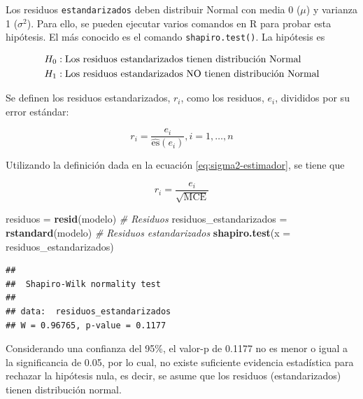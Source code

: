 \documentclass[
  11pt,
]{book}
\newenvironment{Shaded}{\begin{snugshade}}{\end{snugshade}}
\newcommand{\AttributeTok}[1]{\textcolor[rgb]{0.13,0.29,0.53}{#1}}
\newcommand{\CommentTok}[1]{\textcolor[rgb]{0.56,0.35,0.01}{\textit{#1}}}
\newcommand{\FunctionTok}[1]{\textcolor[rgb]{0.13,0.29,0.53}{\textbf{#1}}}
\newcommand{\NormalTok}[1]{#1}
\newcommand{\OtherTok}[1]{\textcolor[rgb]{0.56,0.35,0.01}{#1}}
\theoremstyle{definition}
\theoremstyle{definition}
\theoremstyle{definition}
\theoremstyle{definition}
\theoremstyle{remark}
\begin{document}
Los residuos \texttt{estandarizados} deben distribuir Normal con media 0 (\(\mu\)) y varianza 1 (\(\sigma^2\)). Para ello, se pueden ejecutar varios comandos en R para probar esta hipótesis. El más conocido es el comando \texttt{shapiro.test()}. La hipótesis es

\begin{equation}
\notag
\begin{split}
H_0&: \text{Los residuos estandarizados tienen distribución Normal}\\
H_1&: \text{Los residuos estandarizados NO tienen distribución Normal}\\
\end{split}
\end{equation}

Se definen los residuos estandarizados, \(r_i\), como los residuos, \(e_i\), divididos por su error estándar:

\begin{equation}
r_i = \frac{e_i}{\widehat{\text{es}}(e_i)}, i = 1,\ldots,n
\label{eq:residuos-estandarizados}
\end{equation}

Utilizando la definición dada en la ecuación \eqref{eq:sigma2-estimador}, se tiene que

\begin{equation}
r_i = \frac{e_i}{\sqrt{\text{MCE}}}
\label{eq:residuos-estandarizados-2}
\end{equation}

\begin{Shaded}
\begin{Highlighting}[]
\NormalTok{residuos }\OtherTok{=} \FunctionTok{resid}\NormalTok{(modelo) }\CommentTok{\# Residuos }
\NormalTok{residuos\_estandarizados }\OtherTok{=} \FunctionTok{rstandard}\NormalTok{(modelo) }\CommentTok{\# Residuos estandarizados}
\FunctionTok{shapiro.test}\NormalTok{(}\AttributeTok{x =}\NormalTok{ residuos\_estandarizados)}
\end{Highlighting}
\end{Shaded}

\begin{verbatim}
## 
##  Shapiro-Wilk normality test
## 
## data:  residuos_estandarizados
## W = 0.96765, p-value = 0.1177
\end{verbatim}

Considerando una confianza del 95\%, el valor-p de 0.1177 no es menor o igual a la significancia de 0.05, por lo cual, no existe suficiente evidencia estadística para rechazar la hipótesis nula, es decir, se asume que los residuos (estandarizados) tienen distribución normal.
\end{document}
